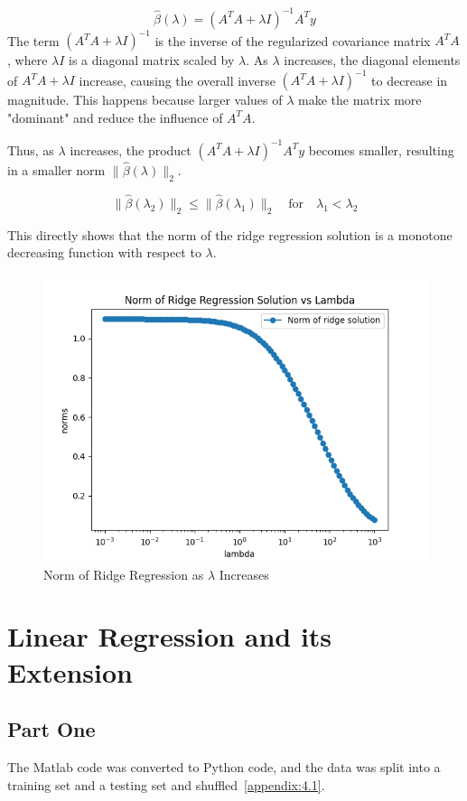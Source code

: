 \documentclass{article}
\begin{document}
\[
\hat{\beta}(\lambda) = (A^T A + \lambda I)^{-1} A^T y
\]
The term \( (A^T A + \lambda I)^{-1} \) is the inverse of the regularized covariance matrix \( A^T A \), where \( \lambda I \) is a diagonal matrix scaled by \( \lambda \). As \( \lambda \) increases, the diagonal elements of \( A^T A + \lambda I \) increase, causing the overall inverse \( (A^T A + \lambda I)^{-1} \) to decrease in magnitude. This happens because larger values of \( \lambda \) make the matrix more "dominant" and reduce the influence of \( A^T A \).

Thus, as \( \lambda \) increases, the product \( (A^T A + \lambda I)^{-1} A^T y \) becomes smaller, resulting in a smaller norm \( \| \hat{\beta}(\lambda) \|_2 \).

\[
\| \hat{\beta}(\lambda_2) \|_2 \leq \| \hat{\beta}(\lambda_1) \|_2 \quad \text{for} \quad \lambda_1 < \lambda_2
\]

This directly shows that the norm of the ridge regression solution is a monotone decreasing function with respect to \( \lambda \).

\begin{figure}[htbp]
    \centering
    \includegraphics[width=\textwidth]{sln_figures/fig3.png}
    \caption{Norm of Ridge Regression as $\lambda$ Increases}
\end{figure}
\FloatBarrier


\section{Linear Regression and its Extension}

\subsection{Part One}
The Matlab code was converted to Python code, and the data was split into a training set and a testing set and shuffled~\ref{appendix:4.1}.
\end{document}
